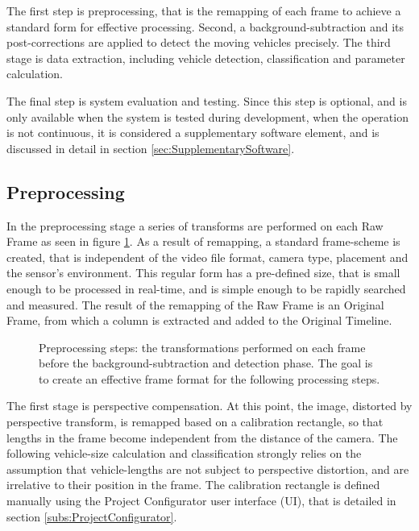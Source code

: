 
The first step is preprocessing, that is the remapping of each frame to achieve a standard form for effective processing.
Second, a background-subtraction and its post-corrections are applied to detect the moving vehicles precisely.
The third stage is data extraction, including vehicle detection, classification and parameter calculation.

The final step is system evaluation and testing. 
Since this step is optional, and is only available when the system is tested during development, when the operation is not continuous, it is considered a supplementary software element, and is discussed in detail in section \ref{sec:SupplementarySoftware}.
\subsection{Preprocessing}
In the preprocessing stage a series of transforms are performed on each Raw Frame as seen in figure \ref{fig:transforms}.
As a result of remapping, a standard frame-scheme is created, that is independent of the video file format, camera type, placement and the sensor's environment.
This regular form has a pre-defined size, that is small enough to be processed in real-time, and is simple enough to be rapidly searched and measured.
The result of the remapping of the Raw Frame is an Original Frame, from which a column is extracted and added to the Original Timeline.

\begin{figure}[!h]
	\centering
	
	\caption{Preprocessing steps: the transformations performed on each frame before the background-subtraction and detection phase. The goal is to create an effective frame format for the following processing steps.\label{fig:transforms}}
\end{figure}

The first stage is perspective compensation.
At this point, the image, distorted by perspective transform, is remapped based on a calibration rectangle, so that lengths in the frame become independent from the distance of the camera.
The following vehicle-size calculation and classification strongly relies on the assumption that vehicle-lengths are not subject to perspective distortion, and are irrelative to their position in the frame.
The calibration rectangle is defined manually using the Project Configurator user interface (UI), that is detailed in section \ref{subs:ProjectConfigurator}.

